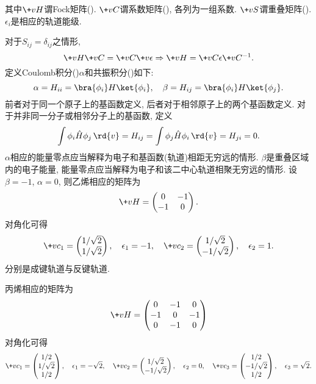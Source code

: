 \documentclass[hidelinks]{ctexart}
\begin{document}
其中$\+vH$谓Fock矩阵(). $\+vC$谓系数矩阵(), 各列为一组系数. $\+vS$谓重叠矩阵(). $\epsilon_i$是相应的轨道能级.
\par
对于$S_{ij} = \delta_{ij}$之情形,
\[ \+vH\+vC = \+vC\+v\epsilon \Rightarrow \+vH = \+vC\epsilon \+vC^{-1}. \]
定义Coulomb积分()$\alpha$和共振积分()如下:
\[ \alpha = H_{ii} = \bra{\phi_i}H\ket{\phi_i},\quad \beta = H_{ij} = \bra{\phi_i}H\ket{\phi_j}. \]
前者对于同一个原子上的基函数定义, 后者对于相邻原子上的两个基函数定义. 对于并非同一分子或相邻分子上的基函数, 定义
\[ \int \phi_i \hat H \phi_j \,\rd{v} = H_{ij} = \int \phi_j \hat H \phi_i \,\rd{v} = H_{ji} = 0. \]
$\alpha$相应的能量零点应当解释为电子和基函数(轨道)相距无穷远的情形. $\beta$是重叠区域内的电子能量, 能量零点应当解释为电子和该二中心轨道相聚无穷远的情形. 设$\beta = -1$, $\alpha = 0$, 则乙烯相应的矩阵为
\[ \+vH = \begin{pmatrix}
    0 & -1 \\
    -1 & 0
\end{pmatrix}. \]
对角化可得
\[ \+vc_1 = \begin{pmatrix}
    1/\sqrt{2} \\
    1/\sqrt{2}
\end{pmatrix},\quad \epsilon_1 = -1,\quad \+vc_2 = \begin{pmatrix}
    1/\sqrt{2} \\
    -1/\sqrt{2}
\end{pmatrix},\quad \epsilon_2 = 1. \]
分别是成键轨道与反键轨道.
\par
丙烯相应的矩阵为
\[ \+vH = \begin{pmatrix}
    0 & -1 & 0 \\
    -1 & 0 & -1 \\
    0 & -1 & 0
\end{pmatrix} \]
对角化可得
\[ \+vc_1 = \begin{pmatrix}
    1/2 \\
    1/\sqrt{2} \\
    1/2
\end{pmatrix},\quad \epsilon_1 = -\sqrt{2},\quad \+vc_2 = \begin{pmatrix}
    1/\sqrt{2} \\
    -1/\sqrt{2}
\end{pmatrix},\quad \epsilon_2 = 0,\quad \+vc_3 = \begin{pmatrix}
    1/2 \\
    -1/\sqrt{2} \\
    1/2
\end{pmatrix},\quad \epsilon_3 = \sqrt{2}. \]
\end{document}
